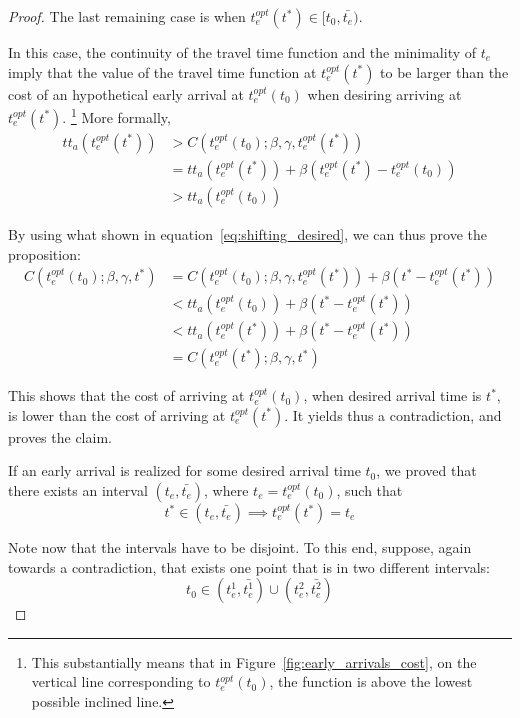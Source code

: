 \begin{proof}
  The last remaining case is when \(t_e^{opt}(t^*) \in [t_0, \bar{t_e})\).
  
  In this case, the continuity of the travel time function and the minimality of \(t_e\) imply that the value of the travel time function at \(t_e^{opt}(t^*)\) to be larger than the cost of an hypothetical early arrival at \(t_e^{opt}(t_0)\) when desiring arriving at \(t_e^{opt}(t^*)\).
  \footnote{This substantially means that in Figure~\ref{fig:early_arrivals_cost}, on the vertical line corresponding to \(t_e^{opt}(t_0)\), the function is above the lowest possible inclined line.}
  More formally,
  \begin{align*}
    tt_a(t_e^{opt}(t^*)) & > C(t_e^{opt}(t_0); \beta, \gamma, t_e^{opt}(t^*)) \\
    & = tt_a(t_e^{opt}(t^*)) + \beta(t_e^{opt}(t^*) - t_e^{opt}(t_0)) \\
    & > tt_a(t_e^{opt}(t_0))
  \end{align*}

  By using what shown in equation~\eqref{eq:shifting_desired}, we can thus prove the proposition:
  \begin{align*}
    C(t_e^{opt}(t_0); \beta, \gamma, t^*) & = C(t_e^{opt}(t_0); \beta, \gamma, t_e^{opt}(t^*)) + \beta(t^* - t_e^{opt}(t^*)) \\
                                          & < tt_a(t_e^{opt}(t_0)) + \beta(t^* - t_e^{opt}(t^*)) \\
                                          & < tt_a(t_e^{opt}(t^*)) + \beta(t^* - t_e^{opt}(t^*)) \\
                                          & = C(t_e^{opt}(t^*); \beta, \gamma, t^*)
  \end{align*}

  This shows that the cost of arriving at \(t_e^{opt}(t_0)\),
  when desired arrival time is \(t^*\),
  is lower than the cost of arriving at \(t_e^{opt}(t^*)\).
  It yields thus a contradiction,
  and proves the claim.

  If an early arrival is realized for some desired arrival time \(t_0\),
  we proved that there exists an interval \((t_e, \bar{t_e})\),
  where \(t_e = t_e^{opt}(t_0)\),
  such that
  \begin{equation*}
    t^* \in (t_e, \bar{t_e}) \implies t_e^{opt}(t^*) = t_e
  \end{equation*}

  Note now that the intervals have to be disjoint.
  To this end, suppose, again towards a contradiction,
  that exists one point that is in two different intervals:
  \begin{equation*}
    t_0 \in (t_e^1, \bar{t_e^1}) \cup (t_e^2, \bar{t_e^2})
  \end{equation*}


\end{proof}
